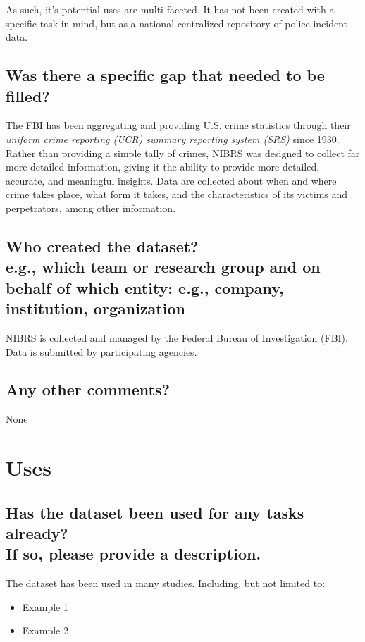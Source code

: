 \documentclass[letterpaper, 10 pt, conference]{ieeeconf}  %
\newcommand{\subtitle}[1]{{\\ \small \normalfont \color{purple} #1}}
\begin{document}
As such, it's potential uses are multi-faceted. It has not been created with a specific task in mind, but as a national centralized repository of police incident data.

\subsection{Was there a specific gap that needed to be filled?}

The FBI has been aggregating and providing U.S. crime statistics through their \textit{uniform crime reporting (UCR) summary reporting system (SRS)} since 1930. Rather than providing a simple tally of crimes, NIBRS was designed to collect far more detailed information, giving it the ability to provide more detailed, accurate, and meaningful insights. Data are collected about when and where crime takes place, what form it takes, and the characteristics of its victims and perpetrators, among other information.

\subsection{Who created the dataset? \subtitle{e.g., which team or research group and on behalf of which entity: e.g., company, institution, organization}}

NIBRS is collected and managed by the Federal Bureau of Investigation (FBI). Data is submitted by participating agencies.


\subsection{Any other comments?}

None

\section{Uses}

\subsection{Has the dataset been used for any tasks already? \subtitle{If so, please provide a description.}}

The dataset has been used in many studies. Including, but not limited to:

\begin{itemize}
    \item Example 1
    \item Example 2
\end{itemize}
\end{document}
